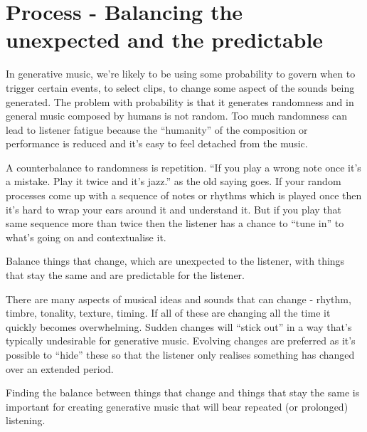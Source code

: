 \documentclass[
  12pt,
  letterpaper,
  oneside,
  open=any]{scrbook}
\begin{document}
\chapter{Process - Balancing the unexpected and the
predictable}\label{Chapter-009-Process-Balance_unexpected_and_predictable}

In generative music, we're likely to be using some probability to govern
when to trigger certain events, to select clips, to change some aspect
of the sounds being generated. The problem with probability is that it
generates randomness and in general music composed by humans is not
random. Too much randomness can lead to listener fatigue because the
``humanity'' of the composition or performance is reduced and it's easy
to feel detached from the music.

A counterbalance to randomness is repetition. ``If you play a wrong note
once it's a mistake. Play it twice and it's jazz.'' as the old saying
goes. If your random processes come up with a sequence of notes or
rhythms which is played once then it's hard to wrap your ears around it
and understand it. But if you play that same sequence more than twice
then the listener has a chance to ``tune in'' to what's going on and
contextualise it.

\begin{tcolorbox}[enhanced jigsaw, opacitybacktitle=0.6, rightrule=.15mm, leftrule=.75mm, opacityback=0, toptitle=1mm, toprule=.15mm, breakable, titlerule=0mm, colback=white, bottomtitle=1mm, title=\textcolor{quarto-callout-tip-color}{\faLightbulb}\hspace{0.5em}{Key idea}, coltitle=black, left=2mm, colframe=quarto-callout-tip-color-frame, bottomrule=.15mm, colbacktitle=quarto-callout-tip-color!10!white, arc=.35mm]

Balance things that change, which are unexpected to the listener, with
things that stay the same and are predictable for the listener.

There are many aspects of musical ideas and sounds that can change -
rhythm, timbre, tonality, texture, timing. If all of these are changing
all the time it quickly becomes overwhelming. Sudden changes will
``stick out'' in a way that's typically undesirable for generative
music. Evolving changes are preferred as it's possible to ``hide'' these
so that the listener only realises something has changed over an
extended period.

Finding the balance between things that change and things that stay the
same is important for creating generative music that will bear repeated
(or prolonged) listening.

\end{tcolorbox}
\end{document}
